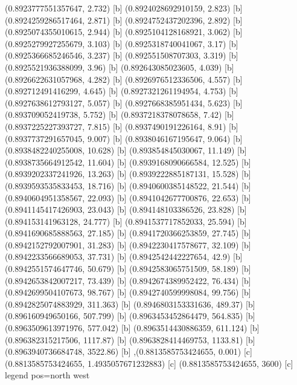 {{{(0.8923777551357647, 2.732) [b] 
(0.8924028692910159, 2.823) [b] 
(0.8924259286517464, 2.871) [b] 
(0.8924752437202396, 2.892) [b] 
(0.8925074355010615, 2.944) [b] 
(0.8925104128168921, 3.062) [b] 
(0.8925279927255679, 3.103) [b] 
(0.8925318740041067, 3.17) [b] 
(0.8925366685246546, 3.237) [b] 
(0.892551508707303, 3.319) [b] 
(0.8925521936388099, 3.96) [b] 
(0.892643085023605, 4.039) [b] 
(0.8926622631057968, 4.282) [b] 
(0.8926976512336506, 4.557) [b] 
(0.892712491416299, 4.645) [b] 
(0.8927321261194954, 4.753) [b] 
(0.8927638612793127, 5.057) [b] 
(0.8927668385951434, 5.623) [b] 
(0.893709052419738, 5.752) [b] 
(0.8937218378078658, 7.42) [b] 
(0.8937225227393727, 7.815) [b] 
(0.8937490191226164, 8.91) [b] 
(0.8937737291657045, 9.007) [b] 
(0.8938046167195647, 9.064) [b] 
(0.8938482240255008, 10.628) [b] 
(0.893854845030067, 11.149) [b] 
(0.8938735664912542, 11.604) [b] 
(0.8939168090666584, 12.525) [b] 
(0.8939202337241926, 13.263) [b] 
(0.8939222885187131, 15.528) [b] 
(0.8939593535833453, 18.716) [b] 
(0.8940600385148522, 21.544) [b] 
(0.8940604951358567, 22.093) [b] 
(0.8941042677700876, 22.653) [b] 
(0.8941145417426903, 23.043) [b] 
(0.894148103386526, 23.828) [b] 
(0.894153141963128, 24.777) [b] 
(0.8941537717852033, 25.594) [b] 
(0.8941690685888563, 27.185) [b] 
(0.8941720366253859, 27.745) [b] 
(0.8942152792007901, 31.283) [b] 
(0.8942230417578677, 32.109) [b] 
(0.8942233566689053, 37.731) [b] 
(0.8942542442227654, 42.9) [b] 
(0.8942551574647746, 50.679) [b] 
(0.8942583065751509, 58.189) [b] 
(0.8942653842007217, 73.439) [b] 
(0.8942674389952422, 76.434) [b] 
(0.8942699504107673, 98.767) [b] 
(0.8942740599998084, 99.756) [b] 
(0.8942825074883929, 311.363) [b] 
(0.8946803153331636, 489.37) [b] 
(0.896160949650166, 507.799) [b] 
(0.8963453452864479, 564.835) [b] 
(0.8963509613971976, 577.042) [b] 
(0.8963514430886359, 611.124) [b] 
(0.896382315217506, 1117.87) [b] 
(0.8963828414469753, 1133.81) [b] 
(0.8963940736684748, 3522.86) [b] 
},{(0.8813585753424655, 0.001) [c] 
(0.8813585753424655, 1.4935057671232883) [c] 
(0.8813585753424655, 3600) [c] 
}}}{legend pos=north west}